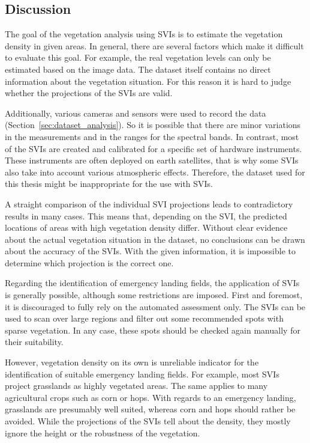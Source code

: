 \subsection{Discussion}
The goal of the vegetation analysis using SVIs is to estimate the vegetation density in given areas. In general, there are several factors which make it difficult to evaluate this goal. For example, the real vegetation levels can only be estimated based on the image data. The dataset itself contains no direct information about the vegetation situation. For this reason it is hard to judge whether the projections of the SVIs are valid.

Additionally, various cameras and sensors were used to record the data (Section~\ref{sec:dataset_analysis}). So it is possible that there are minor variations in the measurements and in the ranges for the spectral bands. In contrast, most of the SVIs are created and calibrated for a specific set of hardware instruments. These instruments are often deployed on earth satellites, that is why some SVIs also take into account various atmospheric effects. Therefore, the dataset used for this thesis might be inappropriate for the use with SVIs.

A straight comparison of the individual SVI projections leads to contradictory results in many cases. This means that, depending on the SVI, the predicted locations of areas with high vegetation density differ. Without clear evidence about the actual vegetation situation in the dataset, no conclusions can be drawn about the accuracy of the SVIs. With the given information, it is impossible to determine which projection is the correct one.

Regarding the identification of emergency landing fields, the application of SVIs is generally possible, although some restrictions are imposed. First and foremost, it is discouraged to fully rely on the automated assessment only. The SVIs can be used to scan over large regions and filter out some recommended spots with sparse vegetation. In any case, these spots should be checked again manually for their suitability.

However, vegetation density on its own is unreliable indicator for the identification of suitable emergency landing fields. For example, most SVIs project grasslands as highly vegetated areas. The same applies to many agricultural crops such as corn or hops. With regards to an emergency landing, grasslands are presumably well suited, whereas corn and hops should rather be avoided. While the projections of the SVIs tell about the density, they mostly ignore the height or the robustness of the vegetation.

\clearpage
